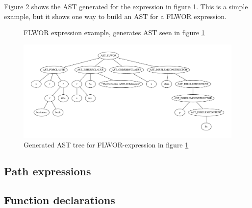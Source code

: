 Figure \ref{tree:ast:flwor1} shows the AST generated for the expression in
figure \ref{code:ast:flwor1}. This is a simple example, but it shows one way to
build an AST for a FLWOR expression.

\begin{figure}[h]

\caption{FLWOR expression example, generates AST seen in figure \ref{code:ast:flwor1}}
\label{code:ast:flwor1}
\end{figure}


\begin{figure}[h]
 \includegraphics[width=1\textwidth]{img/graphs/flwor1}
\caption{Generated AST tree for FLWOR-expression in figure \ref{code:ast:flwor1}}
\label{tree:ast:flwor1}
\end{figure}


\subsection{Path expressions}
\subsection{Function declarations}